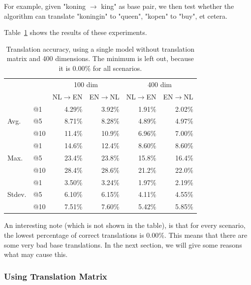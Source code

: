 For example, given "koning $\to$ king" as base pair, we then test whether the algorithm can translate "koningin" to "queen", "kopen" to "buy", et cetera.

Table~\ref{table:results_single_model_no_matrix} shows the results of these experiments.

\begin{table}[ht!]
  \centering
  \label{table:results_single_model_no_matrix}
  \begin{tabular}{ll|r|r|r|r|}
  \cline{3-6}                                       &     & \multicolumn{2}{|c|}{100 dim} & \multicolumn{2}{c|}{400 dim} \\ \cline{3-6} 
                                                    &     & NL$\to$EN   & EN$\to$NL       & NL$\to$EN   & EN$\to$NL      \\ \hline
    \multicolumn{1}{|l|}{\multirow{3}{*}{Avg.}}     & @1  & 4.29\%      & 3.92\%          & 1.91\%      & 2.02\%         \\ \cline{2-6} 
    \multicolumn{1}{|l|}{}                          & @5  & 8.71\%      & 8.28\%          & 4.89\%      & 4.97\%         \\ \cline{2-6} 
    \multicolumn{1}{|l|}{}                          & @10 & 11.4\%      & 10.9\%          & 6.96\%      & 7.00\%         \\ \hline 
    \multicolumn{1}{|l|}{\multirow{3}{*}{Max.}}     & @1  & 14.6\%      & 12.4\%          & 8.60\%      & 8.60\%         \\ \cline{2-6} 
    \multicolumn{1}{|l|}{}                          & @5  & 23.4\%      & 23.8\%          & 15.8\%      & 16.4\%         \\ \cline{2-6} 
    \multicolumn{1}{|l|}{}                          & @10 & 28.4\%      & 28.6\%          & 21.2\%      & 22.0\%         \\ \hline
    \multicolumn{1}{|l|}{\multirow{3}{*}{Stdev.}}   & @1  & 3.50\%      & 3.24\%          & 1.97\%      & 2.19\%         \\ \cline{2-6} 
    \multicolumn{1}{|l|}{}                          & @5  & 6.10\%      & 6.15\%          & 4.11\%      & 4.55\%         \\ \cline{2-6} 
    \multicolumn{1}{|l|}{}                          & @10 & 7.51\%      & 7.60\%          & 5.42\%      & 5.85\%         \\ \hline
  \end{tabular}
  \caption{Translation accuracy, using a single model without translation matrix and 400 dimensions. The minimum is left out, because it is 0.00\% for all scenarios.}
\end{table}

An interesting note (which is not shown in the table), is that for every scenario, the lowest percentage of correct translations is 0.00\%. This means that there are some very bad base translations. In the next section, we will give some reasons what may cause this.

\subsubsection{Using Translation Matrix}
